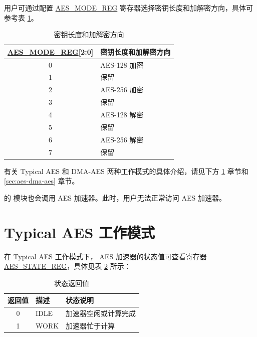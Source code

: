 \documentclass[main\_\_CN.tex]{subfiles}
\begin{document}
用户可通过配置 \hyperref[regdesc:AESMODEREG]{AES\_MODE\_REG} 寄存器选择密钥长度和加解密方向，具体可参考表 \ref{tab:aes-operation}。

\begin{longtable}[c]{ | c | l | }
\caption{密钥长度和加解密方向}
\label{tab:aes-operation}
\\\hline 
\rowcolor{lightgray}
\textbf{\hyperref[regdesc:AESMODEREG]{AES\_MODE\_REG}[2:0]}     & \textbf{密钥长度和加解密方向}\\
    \hline
    0                   & AES-128 加密    \\
    \hline
    1                   & 保留    \\
    \hline
    2                   & AES-256 加密    \\
    \hline
    3                   & 保留    \\
    \hline
    4                   & AES-128 解密    \\
    \hline
    5                   & 保留    \\
    \hline
    6                   & AES-256 解密    \\
    \hline
    7                   & 保留    \\
    \hline
\end{longtable}

有关 Typical AES 和 DMA-AES 两种工作模式的具体介绍，请见下方 \ref{sec:aes-typical-modes} 章节和 \ref{sec:aes-dma-aes} 章节。

\begin{importantlisting}
\vspace{-0.5em}

    \chipname{} 的  模块也会调用 AES 加速器。此时，用户无法正常访问 AES 加速器。
\end{importantlisting}

\section{Typical AES 工作模式}\label{sec:aes-typical-modes}

在 Typical AES 工作模式下，
AES 加速器的状态值可查看寄存器 \hyperref[regdesc:AESSTATEREG]{AES\_STATE\_REG}，具体见表 \ref{tab:aes-state-value-typical} 所示：

\clearpage
\begin{longtable}[c]{ |c | l | l | }
\caption{状态返回值}
\label{tab:aes-state-value-typical}
\\\hline 
\rowcolor{lightgray}
\textbf{返回值} & \textbf{描述} &  \textbf{状态说明} \\ \hline

    0                   & IDLE      &   加速器空闲或计算完成\\ \hline
    1                   & WORK      &   加速器忙于计算     \\ \hline
\end{longtable}
\end{document}

